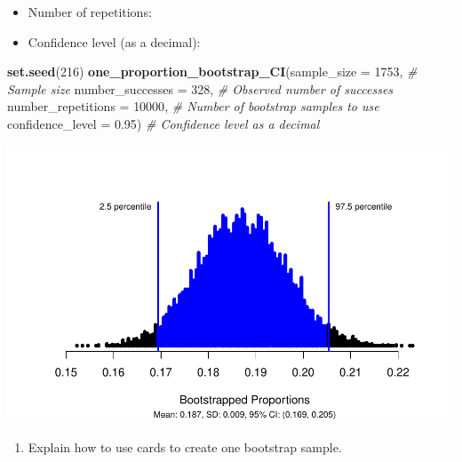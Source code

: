 \documentclass[
]{report}
\newenvironment{Shaded}{\begin{snugshade}}{\end{snugshade}}
\newcommand{\AttributeTok}[1]{\textcolor[rgb]{0.13,0.29,0.53}{#1}}
\newcommand{\CommentTok}[1]{\textcolor[rgb]{0.56,0.35,0.01}{\textit{#1}}}
\newcommand{\DecValTok}[1]{\textcolor[rgb]{0.00,0.00,0.81}{#1}}
\newcommand{\FloatTok}[1]{\textcolor[rgb]{0.00,0.00,0.81}{#1}}
\newcommand{\FunctionTok}[1]{\textcolor[rgb]{0.13,0.29,0.53}{\textbf{#1}}}
\newcommand{\NormalTok}[1]{#1}
\providecommand{\tightlist}{%
  \setlength{\itemsep}{0pt}\setlength{\parskip}{0pt}}
\begin{document}
\vspace{.1in}

\begin{itemize}
\tightlist
\item
  Number of repetitions:
\end{itemize}

\vspace{.1in}

\begin{itemize}
\tightlist
\item
  Confidence level (as a decimal):
\end{itemize}

\vspace{.1in}

\newpage

\begin{Shaded}
\begin{Highlighting}[]
\FunctionTok{set.seed}\NormalTok{(}\DecValTok{216}\NormalTok{)}
\FunctionTok{one\_proportion\_bootstrap\_CI}\NormalTok{(}\AttributeTok{sample\_size =} \DecValTok{1753}\NormalTok{, }\CommentTok{\# Sample size}
                    \AttributeTok{number\_successes =} \DecValTok{328}\NormalTok{, }\CommentTok{\# Observed number of successes}
                    \AttributeTok{number\_repetitions =} \DecValTok{10000}\NormalTok{, }\CommentTok{\# Number of bootstrap samples to use}
                    \AttributeTok{confidence\_level =} \FloatTok{0.95}\NormalTok{) }\CommentTok{\# Confidence level as a decimal}
\end{Highlighting}
\end{Shaded}

\begin{center}\includegraphics[width=0.7\linewidth]{05-UR-module3_review_files/figure-latex/unnamed-chunk-4-1} \end{center}

\begin{enumerate}
\def\labelenumi{\arabic{enumi}.}
\setcounter{enumi}{11}
\tightlist
\item
  Explain how to use cards to create one bootstrap sample.
\end{enumerate}
\end{document}
